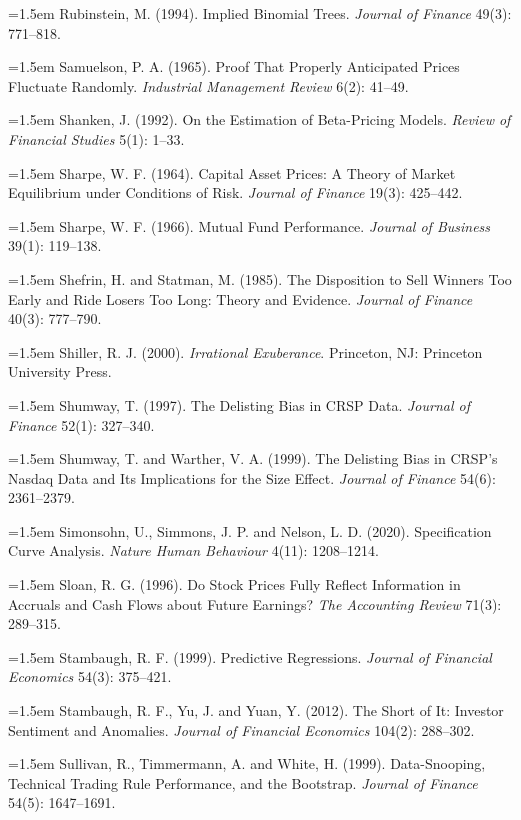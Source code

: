 \hangindent=1.5em Rubinstein, M. (1994). Implied Binomial Trees. \emph{Journal of Finance} 49(3): 771--818.

\hangindent=1.5em Samuelson, P. A. (1965). Proof That Properly Anticipated Prices Fluctuate Randomly. \emph{Industrial Management Review} 6(2): 41--49.

\hangindent=1.5em Shanken, J. (1992). On the Estimation of Beta-Pricing Models. \emph{Review of Financial Studies} 5(1): 1--33.

\hangindent=1.5em Sharpe, W. F. (1964). Capital Asset Prices: A Theory of Market Equilibrium under Conditions of Risk. \emph{Journal of Finance} 19(3): 425--442.

\hangindent=1.5em Sharpe, W. F. (1966). Mutual Fund Performance. \emph{Journal of Business} 39(1): 119--138.

\hangindent=1.5em Shefrin, H. and Statman, M. (1985). The Disposition to Sell Winners Too Early and Ride Losers Too Long: Theory and Evidence. \emph{Journal of Finance} 40(3): 777--790.

\hangindent=1.5em Shiller, R. J. (2000). \emph{Irrational Exuberance}. Princeton, NJ: Princeton University Press.

\hangindent=1.5em Shumway, T. (1997). The Delisting Bias in CRSP Data. \emph{Journal of Finance} 52(1): 327--340.

\hangindent=1.5em Shumway, T. and Warther, V. A. (1999). The Delisting Bias in CRSP's Nasdaq Data and Its Implications for the Size Effect. \emph{Journal of Finance} 54(6): 2361--2379.

\hangindent=1.5em Simonsohn, U., Simmons, J. P. and Nelson, L. D. (2020). Specification Curve Analysis. \emph{Nature Human Behaviour} 4(11): 1208--1214.

\hangindent=1.5em Sloan, R. G. (1996). Do Stock Prices Fully Reflect Information in Accruals and Cash Flows about Future Earnings? \emph{The Accounting Review} 71(3): 289--315.

\hangindent=1.5em Stambaugh, R. F. (1999). Predictive Regressions. \emph{Journal of Financial Economics} 54(3): 375--421.

\hangindent=1.5em Stambaugh, R. F., Yu, J. and Yuan, Y. (2012). The Short of It: Investor Sentiment and Anomalies. \emph{Journal of Financial Economics} 104(2): 288--302.

\hangindent=1.5em Sullivan, R., Timmermann, A. and White, H. (1999). Data-Snooping, Technical Trading Rule Performance, and the Bootstrap. \emph{Journal of Finance} 54(5): 1647--1691.

